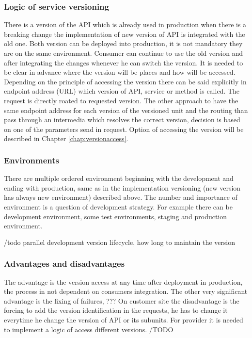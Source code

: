 \subsubsection{Logic of service versioning}
There is a version of the API which is already used in production when there is a breaking change the implementation of new version of API is integrated with the old one. Both version can be deployed into production, it is not mandatory they are on the same environment. Consumer can continue to use the old version and after integrating the changes whenever he can switch the version. It is needed to be clear in advance where the version will be places and how will be accessed.
Depending on the principle of accessing the version there can be said explicitly in endpoint address (URL) which version of API, service or method is called. The request is directly roated to requested version. The other approach to have the same endpoint address for each version of the versioned unit and the routing than pass through an intermedia which resolves the correct version, decision is based on one of the parameters send in request. Option of accessing the version will be described in Chapter \ref{chap:versionaccess}.

\subsubsection{Environments}
There are multiple ordered environment beginning with the development and ending with production, same as in the implementation versioning (new version has always new environment) described above. The number and importance of environment is a question of development strategy. For example there can be development environment, some test environments, staging and production environment. 

/todo
parallel development
version lifecycle, how long to maintain the version

\subsubsection{Advantages and disadvantages}
The advantage is the version access at any time after deployment in production, the process in not dependent on consumers integration. The other very significant advantage is the fixing of failures, ???
On customer site the disadvantage is the forcing to add the version identification in the requests, he has to change it everytime he change the version of API or its subunits. For provider it is needed to implement a logic of access different versions.
/TODO



